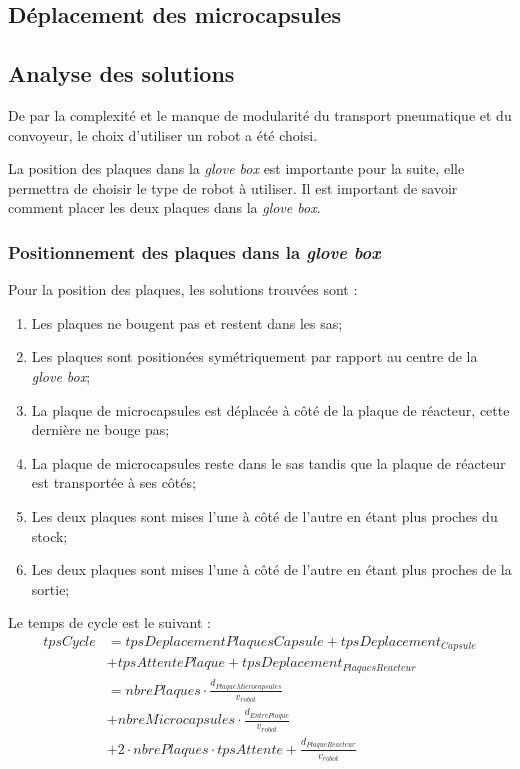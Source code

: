 \subsection{Déplacement des microcapsules}


\subsection{Analyse des solutions}
De par la complexité et le manque de modularité du transport pneumatique et du convoyeur, le choix d'utiliser un robot a été choisi.

La position des plaques dans la \textit{glove box} est importante pour la suite, elle permettra de choisir le type de robot à utiliser.
Il est important de savoir comment placer les deux plaques dans la \textit{glove box}.
\subsubsection{Positionnement des plaques dans la \textit{glove box}}
Pour la position des plaques, les solutions trouvées sont : 
\begin{enumerate}
    \item Les plaques ne bougent pas et restent dans les sas;
    \item Les plaques sont positionées symétriquement par rapport au centre de la \textit{glove box};
    \item La plaque de microcapsules est déplacée à côté de la plaque de réacteur, cette dernière ne bouge pas;
    \item La plaque de microcapsules reste dans le sas tandis que la plaque de réacteur est transportée à ses côtés;
    \item Les deux plaques sont mises l'une à côté de l'autre en étant plus proches du stock;
    \item Les deux plaques sont mises l'une à côté de l'autre en étant plus proches de la sortie;
\end{enumerate}
Le temps de cycle est le suivant :
\begin{align*}
    tpsCycle &= tpsDeplacementPlaquesCapsule + tpsDeplacement_{Capsule} \\
    &+ tpsAttentePlaque + tpsDeplacement_{PlaquesReacteur}\\
    &= nbrePlaques\cdot \frac{d_{PlaqueMicrocapsules}}{v_{robot}} \\&+ nbreMicrocapsules\cdot \frac{d_{EntrePlaque}}{v_{robot}} \\
    &+ 2\cdot nbrePlaques\cdot tpsAttente + \frac{d_{PlaqueReacteur}}{v_{robot}}
\end{align*}

